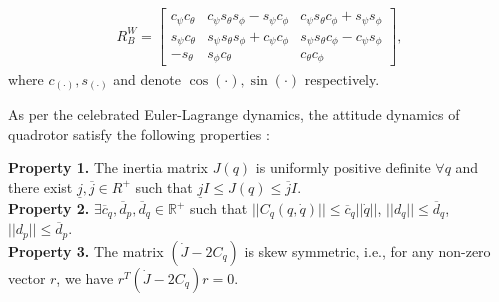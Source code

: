 	\begin{align}
	R_B^W =
	\begin{bmatrix}
	c_{\psi}c_{\theta} & c_{\psi}s_{\theta}s_{\phi} - s_{\psi}c_{\phi} & c_{\psi}s_{\theta}c_{\phi} + s_{\psi}s_{\phi} \\
	s_{\psi}c_{\theta} & s_{\psi}s_{\theta}s_{\phi} + c_{\psi}c_{\phi} & s_{\psi}s_{\theta}c_{\phi} - c_{\psi}s_{\phi} \\
	-s_{\theta} & s_{\phi}c_{\theta} & c_{\theta}c_{\phi}
	\end{bmatrix}, \label{rot_matrix}
	\end{align}
	where $c_{(\cdot)} , s_{(\cdot)}$ and denote $\cos{(\cdot)} , \sin{(\cdot)}$ respectively. 
	
	As per the celebrated Euler-Lagrange dynamics, the attitude dynamics of quadrotor satisfy the following properties \cite{bialy2013lyapunov}:
	
\noindent\textbf{Property 1.} The inertia matrix $J (q)$ is uniformly positive definite $\forall q$ and there exist $\underline{j},\overline{j} \in{R}^{+}$ such that $ \underline{j}I \leq J(q) \leq \overline{j}I$. \\
\textbf{Property 2.} $\exists \overline{c}_q, \overline{d}_p, \overline{d}_q \in\mathbb{R}^{+}$ such that $||C_q(q,\dot{q})|| \leq \overline{c}_q||\dot{q}||$, $||d_q|| \leq \overline{d}_q$, $||d_p|| \leq \overline{d}_p$. \\ %
\textbf{Property 3.} The matrix $(\dot{J} - 2C_q)$ is skew symmetric, i.e., for any non-zero vector $r$, we have $r^T(\dot{J} - 2C_q)r = 0$.

